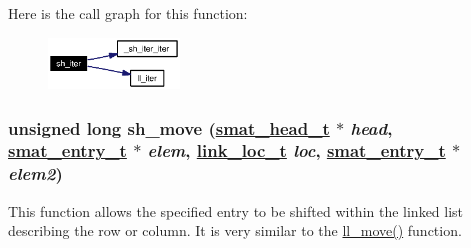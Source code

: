 Here is the call graph for this function:\begin{figure}[H]
\begin{center}
\leavevmode
\includegraphics[width=99pt]{group__dbprim__smat_ga23_cgraph}
\end{center}
\end{figure}
\hypertarget{group__dbprim__smat_ga21}{
\subsubsection[sh\_\-move]{\setlength{\rightskip}{0pt plus 5cm}unsigned long sh\_\-move (\hyperlink{struct__smat__head__s}{smat\_\-head\_\-t} $\ast$ {\em head}, \hyperlink{struct__smat__entry__s}{smat\_\-entry\_\-t} $\ast$ {\em elem}, \hyperlink{group__dbprim__link_ga4}{link\_\-loc\_\-t} {\em loc}, \hyperlink{struct__smat__entry__s}{smat\_\-entry\_\-t} $\ast$ {\em elem2})}}
\label{group__dbprim__smat_ga21}


This function allows the specified entry to be shifted within the linked list describing the row or column. It is very similar to the \hyperlink{group__dbprim__link_ga7}{ll\_\-move()} function.

